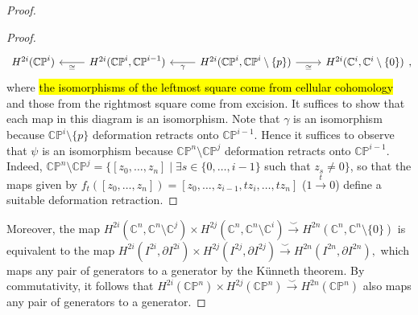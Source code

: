 \documentclass[10pt,letterpaper,cm]{nupset}
\theoremstyle{definition}
\theoremstyle{theorem}
\theoremstyle{remark}
\newcommand{\C}{\mathbb C}
\newcommand{\CP}{\mathbb{CP}}
\newcommand{\1}{\mathbb{1}}
\newcommand{\0}{\vec 0}
\begin{document}
\begin{proof}
\begin{proof}
\[\begin{tikzcd}
H^{2i}(\CP^i)                     & {H^{2i}(\CP^i, \CP^{i-1})} \arrow[l, "\cong"]                      & {H^{2i}(\CP^i, \CP^i \setminus \{p\})} \arrow[l, "\gamma"] \arrow[r, "\cong"']                             & {H^{2i}(\C^i, \C^i \setminus \{0\})}           
\end{tikzcd}
,\] where \hl{the isomorphisms of the leftmost square come from cellular cohomology} and those from the rightmost square come from excision. It suffices to show that each map in this diagram is an isomorphism. Note that $\gamma$ is an isomorphism because $\CP^i \setminus \{p\}$ deformation retracts onto $\CP^{i-1}$. Hence it suffices to observe that $\psi$ is an isomorphism because $\CP^n \setminus \CP^{j}$ deformation retracts onto $\CP^{i-1}$. Indeed, $\CP^n \setminus \CP^{j}= \{[z_0, \ldots, z_n] \mid \exists s \in \{0, \ldots, i-1\}$ such that $z_s \ne 0\}$, so that the maps given by $f_t([z_0, \ldots, z_n])  = [z_0, \ldots, z_{i-1}, tz_i, \ldots, tz_n]$ ($1 \overset{t}{\rightarrow} 0$) define a suitable deformation retraction. 
\end{proof}
Moreover, the map $H^{2i}(\C^n, \C^n \setminus \C^j)\times H^{2j}(\C^n, \C^n \setminus \C^i) \overset{\smile}{\longrightarrow} H^{2n}(\C^n, \C^n \setminus \{0\})$ is equivalent to the map $H^{2i}(I^{2i}, \partial{I^{2i}})\times H^{2j}(I^{2j}, \partial{I^{2j}}) \overset{\smile}{\longrightarrow} H^{2n}(I^{2n}, \partial{I^{2n}}),$ which maps any pair of generators to a generator by the K\"unneth theorem. 
By commutativity, it follows that $ H^{2i}(\CP^n)\times H^{2j}(\CP^n) \overset{\smile}{\longrightarrow} H^{2n}(\CP^n) $ also maps any pair of generators to a generator.  
\end{proof}
\end{document}

